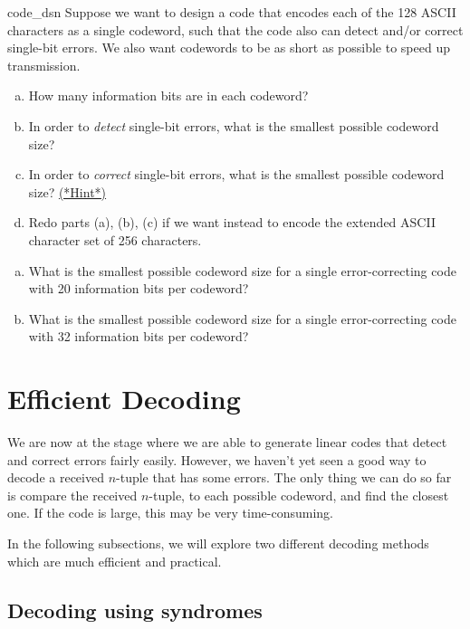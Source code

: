  \begin{exercise}{code_dsn}
 Suppose we want to design a code that encodes each of the 128 ASCII characters as a single codeword, such that the code also can detect and/or correct single-bit errors. We also want codewords to be as short as possible to speed up transmission. 
 \begin{enumerate}[(a)]
 \item
 How many information bits are in each codeword?
 \item
 In order to \emph{detect} single-bit errors, what is the smallest possible codeword size?
\item
 In order to \emph{correct} single-bit errors, what is the smallest possible codeword size?  \hyperref[sec:algcodes:hints]{(*Hint*)}

\item
Redo parts (a), (b), (c) if we want instead to encode the extended ASCII character set of 256 characters.
\end{enumerate}
\end{exercise}

\begin{exercise}{}
\begin{enumerate}[(a)]
\item
What is the smallest possible codeword size for a single error-correcting code with 20 information bits per codeword? 
\item
What is the smallest possible codeword size for a single error-correcting code with 32 information bits per codeword? 
\end{enumerate}
\end{exercise}

\section{Efficient Decoding}\label{sec:efficientDecoding}
 
 
We are now at the stage where we are able to generate linear codes
that detect and correct errors fairly easily. However, we haven't yet seen  a good way 
 to decode a received $n$-tuple that has some errors. The only thing we can do so far is compare  the received $n$-tuple, 
to each possible codeword, and find the closest one.
If the code is large, this may be very time-consuming. 

In the following subsections, we will explore two different decoding methods which are much efficient and practical.
 
\subsection{Decoding using syndromes}

